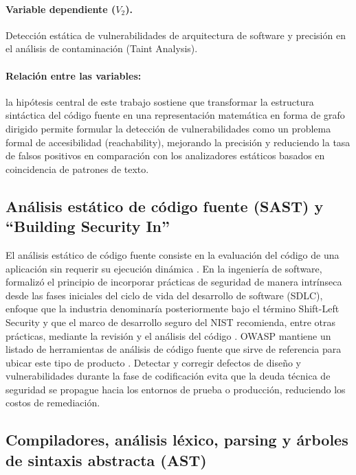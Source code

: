\paragraph{Variable dependiente ($V_2$).} Detección estática de vulnerabilidades de arquitectura de software y precisión en el análisis de contaminación (Taint Analysis).

\paragraph{Relación entre las variables:} la hipótesis central de este trabajo sostiene que transformar la estructura sintáctica del código fuente en una representación matemática en forma de grafo dirigido permite formular la detección de vulnerabilidades como un problema formal de accesibilidad (reachability), mejorando la precisión y reduciendo la tasa de falsos positivos en comparación con los analizadores estáticos basados en coincidencia de patrones de texto.

\subsection{Análisis estático de código fuente (SAST) y \enquote{Building Security In}}\label{sec:n3.2.1}

El análisis estático de código fuente consiste en la evaluación del código de una aplicación sin requerir su ejecución dinámica \citep{nielson1999}. En la ingeniería de software, \citet{mcgraw2006} formalizó el principio de incorporar prácticas de seguridad de manera intrínseca desde las fases iniciales del ciclo de vida del desarrollo de software (SDLC), enfoque que la industria denominaría posteriormente bajo el término Shift-Left Security y que el marco de desarrollo seguro del NIST recomienda, entre otras prácticas, mediante la revisión y el análisis del código \citep{nistssdf}. OWASP mantiene un listado de herramientas de análisis de código fuente que sirve de referencia para ubicar este tipo de producto \citep{owaspsast}. Detectar y corregir defectos de diseño y vulnerabilidades durante la fase de codificación evita que la deuda técnica de seguridad se propague hacia los entornos de prueba o producción, reduciendo los costos de remediación.

\subsection{Compiladores, análisis léxico, parsing y árboles de sintaxis abstracta (AST)}\label{sec:n3.2.2}

